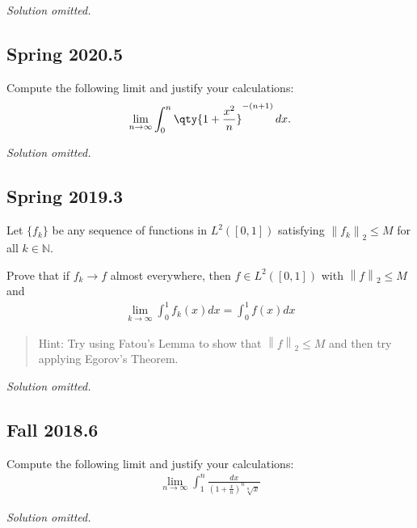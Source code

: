 \emph{Solution omitted.}

\hypertarget{spring-2020.5}{%
\subsection{Spring 2020.5}\label{spring-2020.5}}

Compute the following limit and justify your calculations:
\begin{align*}
\lim_{n\to\infty} \int_0^n \qty{1 + {x^2 \over n}}^{-(n+1)} \,dx
.\end{align*}


\emph{Solution omitted.}

\hypertarget{spring-2019.3}{%
\subsection{Spring 2019.3}\label{spring-2019.3}}

Let \(\{f_k\}\) be any sequence of functions in \(L^2([0, 1])\)
satisfying \({\left\lVert {f_k} \right\rVert}_2 ≤ M\) for all
\(k ∈ {\mathbb{N}}\).

Prove that if \(f_k \to f\) almost everywhere, then \(f ∈ L^2([0, 1])\)
with \({\left\lVert {f} \right\rVert}_2 ≤ M\) and
\begin{align*}
\lim _{k \rightarrow \infty} \int_{0}^{1} f_{k}(x) dx = \int_{0}^{1} f(x) d x
\end{align*}

\begin{quote}
Hint: Try using Fatou's Lemma to show that
\({\left\lVert {f} \right\rVert}_2 ≤ M\) and then try applying Egorov's
Theorem.
\end{quote}

\emph{Solution omitted.}

\hypertarget{fall-2018.6}{%
\subsection{Fall 2018.6}\label{fall-2018.6}}

Compute the following limit and justify your calculations:
\begin{align*}
\lim_{n \rightarrow \infty} \int_{1}^{n} \frac{d x}{\left(1+\frac{x}{n}\right)^{n} \sqrt[n]{x}}
\end{align*}


\emph{Solution omitted.}


